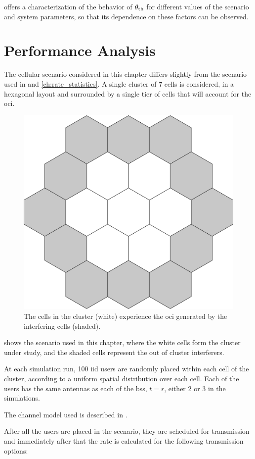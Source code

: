  offers a characterization of the behavior of $\theta_{\text{th}}$ for
different values of the scenario and system parameters, so that its dependence
on these factors can be observed.

\section{Performance Analysis}\label{sec:sched_performance}

The cellular scenario considered in this chapter differs slightly from the
scenario used in  and \ref{ch:rate_statistics}. A single
cluster of 7 cells is considered, in a hexagonal layout and surrounded by a
single tier of cells that will account for the \gls{oci}.

\begin{figure}[t]
    \centering
    \includegraphics[width=0.4\columnwidth]{./12.simple_threshold_scheduling/img/scenario}
    \caption{The cells in the cluster (white) experience the \gls{oci} generated
    by the interfering cells (shaded).}
    \label{fig:scenario_threshold}
\end{figure}

 shows the scenario used in this chapter, where the
white cells form the cluster under study, and the shaded cells represent the out
of cluster interferers.

At each simulation run, 100 \gls{iid} users are randomly placed within each cell
of the cluster, according to a uniform spatial distribution over each cell. Each
of the users has the same antennas as each of the \glspl{bs}, \ie $t=r$, either
2 or 3 in the simulations.

The channel model used is described in .

After all the users are placed in the scenario, they are scheduled for
transmission and immediately after that the rate is calculated for the following
transmission options:

